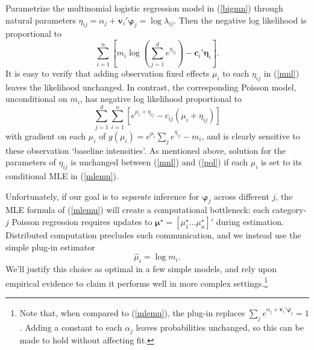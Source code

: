 \documentclass[12pt]{article}
\newcommand{\bs}[1]{\boldsymbol{#1}}
\newcommand{\bm}[1]{\mathbf{#1}}
\begin{document}
Parametrize the multinomial logistic regression model in (\ref{bigmn}) through
natural parameters $\eta_{ij} =
\alpha_{j} + \bm{v}_i'\bs{\varphi}_j = \log\lambda_{ij}$.  Then the negative
log likelihood is proportional to
\begin{equation}
\label{mnl} \sum_{i=1}^n\left[ m_i\log\left(\sum_{j=1}^d e^{\eta_{ij}}\right)
- \bm{c}_{i}'\bs{\eta}_{i} \right]. 
\end{equation} 
It is easy to verify that adding observation fixed effects $\mu_i$ to each
$\eta_{ij}$ in (\ref{mnl}) leaves the likelihood unchanged.  In contrast, the
corresponding Poisson model, unconditional on $m_i$, has negative log
likelihood proportional to 
\begin{equation} \label{pol}
\sum_{j=1}^d\sum_{i=1}^n\left[ e^{\mu_i + \eta_{ij}} - c_{ij}(\mu_i +
\eta_{ij}) \right] 
\end{equation} 
with gradient on each $\mu_i$ of $g(\mu_i) =
e^{\mu_i}\sum_j e^{\eta_{ij}} - m_i$, and  is clearly sensitive to these
observation `baseline intensities'.  As mentioned above, solution for the
parameters of $\eta_{ij}$ is unchanged between (\ref{mnl}) and (\ref{pol}) if
each $\mu_i$ is set to its conditional MLE in (\ref{mlemu}).

Unfortunately, if our goal is to {\it separate} inference for $\bs{\varphi}_j$
across different $j$, the MLE formula of (\ref{mlemu}) will create a
computational bottleneck: each category-$j$ Poisson regression requires
updates to $\bs{\mu}^\star = [\mu^\star_1 \ldots \mu^\star_n]'$ during
estimation.  Distributed computation precludes such communication, and
we instead use the simple plug-in estimator
\begin{equation}\label{plugin}
\hat \mu_i = \log m_i.
\end{equation}
 We'll justify this choice as optimal in a few simple models, and rely upon
  empirical evidence to claim it performs well in more complex
  settings.\footnote{ Note that, when compared to (\ref{mlemu}), the plug-in
  replaces $\sum_j e^{\alpha_j
+ \bm{v}_i'\bs{\varphi}_j} = 1$.  Adding a constant to each
  $\alpha_j$ leaves probabilities unchanged, so this can be made to hold without
  affecting fit.}  
\end{document}
